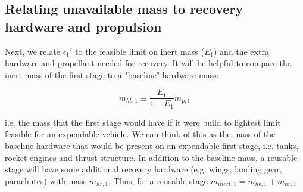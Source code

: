 \documentclass[conf]{new-aiaa}
\begin{document}
\subsection{Relating unavailable mass to recovery hardware and propulsion}
Next, we relate $\epsilon_1'$ to the feasible limit on inert mass ($E_1$) and the extra hardware and propellant needed for recovery.
It will be helpful to compare the inert mass of the first stage to a "baseline" hardware mass:

\begin{equation}
m_{hb,1} \equiv \frac{E_1}{1 - E_1} m_{p,1}
\end{equation}

i.e. the mass that the first stage would have if it were build to lightest limit feasible for an expendable vehicle. We can think of this as the mass of the baseline hardware that would be present on an expendable first stage, i.e. tanks, rocket engines and thrust structure. In addition to the baseline mass, a reusable stage will have some additional recovery hardware (e.g. wings, landing gear, parachutes) with mass $m_{hr,1}$. Thus, for a reusable stage $m_{inert,1} = m_{hb,1} + m_{hr,1}$.
\end{document}
